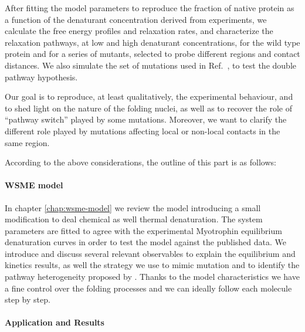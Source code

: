 After fitting the model parameters  to reproduce the fraction of native 
protein as a function of the denaturant concentration derived from experiments, 
we calculate  the free energy profiles and relaxation rates, and characterize 
the relaxation pathways, at low and high denaturant concentrations, for the wild 
type protein and for a series of mutants, selected to probe different regions 
and contact distances. We also simulate the set of mutations used in 
Ref.~\cite{Lowe2007}, to test the double pathway hypothesis.

Our goal is to  reproduce, at least qualitatively, the experimental behaviour, 
and to shed light on the nature of the folding nuclei, as well as to recover 
the role of ``pathway switch'' played by some mutations. 
Moreover, we want to clarify the different role played by mutations affecting 
local or non-local contacts in the same region.



According to the above considerations, the outline of this part is as follows:

\paragraph{WSME model}

In chapter \ref{chap:wsme-model} we review the model introducing a small
modification to deal chemical as well thermal denaturation.
The system parameters are fitted to agree with the experimental Myotrophin equilibrium denaturation
curves in order to test the model against the published data.
We introduce and discuss several relevant observables to explain the equilibrium
and kinetics results, as well the strategy we use to mimic mutation and to
identify the pathway heterogeneity proposed by \citet{Lowe2007}.
Thanks to the model characteristics we have a fine control over the folding
processes and we can ideally follow each molecule step by step. 


\paragraph{Application and Results}

